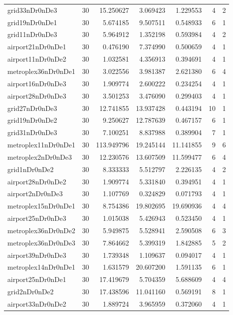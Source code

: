 \documentclass[../../../thesis.tex]{subfiles}
\begin{document}
\begin{longtable}{|l|r|r|r|r|r|r|}
grid33nDr0nDe3 & 30 & 15.250627 & 3.069423 & 1.229553 & 4 & 2 \\
grid19nDr0nDe1 & 30 & 5.674185 & 9.507511 & 0.548933 & 6 & 1 \\
grid11nDr0nDe3 & 30 & 5.964912 & 1.352198 & 0.593984 & 4 & 2 \\
airport21nDr0nDe1 & 30 & 0.476190 & 7.374990 & 0.500659 & 4 & 1 \\
airport11nDr0nDe2 & 30 & 1.032581 & 4.356913 & 0.394691 & 4 & 1 \\
metroplex36nDr0nDe1 & 30 & 3.022556 & 3.981387 & 2.621380 & 6 & 4 \\
airport16nDr0nDe3 & 30 & 1.909774 & 2.600222 & 0.234254 & 4 & 1 \\
airport28nDr0nDe3 & 30 & 3.501253 & 3.476090 & 0.299403 & 4 & 1 \\
grid27nDr0nDe3 & 30 & 12.741855 & 13.937428 & 0.443194 & 10 & 1 \\
grid19nDr0nDe2 & 30 & 9.250627 & 12.787639 & 0.467157 & 6 & 1 \\
grid31nDr0nDe3 & 30 & 7.100251 & 8.837988 & 0.389904 & 7 & 1 \\
metroplex11nDr0nDe1 & 30 & 113.949796 & 19.245144 & 11.141855 & 9 & 6 \\
metroplex2nDr0nDe3 & 30 & 12.230576 & 13.607509 & 11.599477 & 6 & 4 \\
grid1nDr0nDe2 & 30 & 8.333333 & 5.512797 & 2.226135 & 4 & 2 \\
airport28nDr0nDe2 & 30 & 1.909774 & 5.331840 & 0.394951 & 4 & 1 \\
airport2nDr0nDe3 & 30 & 1.107769 & 0.324829 & 0.071793 & 4 & 1 \\
metroplex15nDr0nDe1 & 30 & 8.754386 & 19.802695 & 19.690936 & 4 & 4 \\
airport25nDr0nDe3 & 30 & 1.015038 & 5.426943 & 0.523450 & 4 & 1 \\
metroplex36nDr0nDe2 & 30 & 5.949875 & 5.528941 & 2.590508 & 6 & 3 \\
metroplex36nDr0nDe3 & 30 & 7.864662 & 5.399319 & 1.842885 & 5 & 2 \\
airport39nDr0nDe3 & 30 & 1.739348 & 1.109637 & 0.094017 & 4 & 1 \\
metroplex14nDr0nDe1 & 30 & 1.631579 & 20.607200 & 1.591135 & 6 & 1 \\
airport25nDr0nDe1 & 30 & 17.419679 & 5.704359 & 5.688609 & 4 & 4 \\
grid2nDr0nDe2 & 30 & 17.438596 & 11.041160 & 0.569191 & 8 & 1 \\
airport33nDr0nDe2 & 30 & 1.889724 & 3.965959 & 0.372060 & 4 & 1 \\

\end{longtable}
\end{document}
